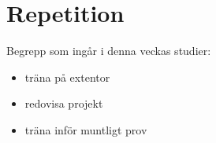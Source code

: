 \chapter{Repetition}\label{chapter:W13}
Begrepp som ingår i denna veckas studier:
\begin{itemize}[noitemsep,label={$\square$},leftmargin=*]
\item träna på extentor
\item redovisa projekt
\item träna inför muntligt prov\end{itemize}
